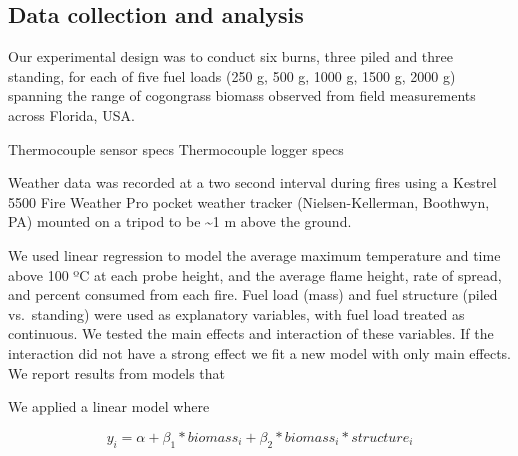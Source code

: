 \documentclass[11pt,a4paper]{article}
\begin{document}
\hypertarget{data-collection-and-analysis}{%
\subsection{Data collection and
analysis}\label{data-collection-and-analysis}}

Our experimental design was to conduct six burns, three piled and three
standing, for each of five fuel loads (250 g, 500 g, 1000 g, 1500 g,
2000 g) spanning the range of cogongrass biomass observed from field
measurements across Florida, USA.

Thermocouple sensor specs Thermocouple logger specs

Weather data was recorded at a two second interval during fires using a
Kestrel 5500 Fire Weather Pro pocket weather tracker (Nielsen-Kellerman,
Boothwyn, PA) mounted on a tripod to be \textasciitilde{}1 m above the
ground.

We used linear regression to model the average maximum temperature and
time above 100 ºC at each probe height, and the average flame height,
rate of spread, and percent consumed from each fire. Fuel load (mass)
and fuel structure (piled vs.~standing) were used as explanatory
variables, with fuel load treated as continuous. We tested the main
effects and interaction of these variables. If the interaction did not
have a strong effect we fit a new model with only main effects. We
report results from models that

We applied a linear model where

\[
y_{i} = \alpha + \beta_{1}*biomass_{i} + \beta_{2}*biomass_{i}*structure_{i}
\]
\end{document}
